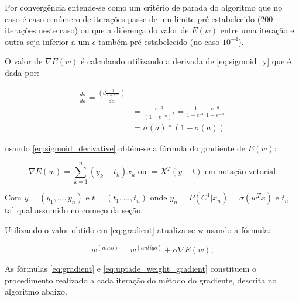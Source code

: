 Por convergência entende-se como um critério de parada do algoritmo que no caso é caso o número de
iterações passe de um limite pré-estabelecido (200 iterações neste caso) ou que a diferença do valor
de $E(w)$ entre uma iteração e outra seja inferior a um $\epsilon$ também pré-estabelecido (no caso
$10^{-4}$).

O valor de $\nabla E(w)$ é calculando utilizando a derivada de \ref{eq:sigmoid_y} que é dada
por:

\begin{center}
	\begin{equation}
		\begin{split}
		\label{eq:sigmoid_derivative}
			\frac{d \sigma}{d a} = \frac{\left(d \frac{1}{1 + e^{-a}}\right)}{d a} \\
				& = \frac{e^{-a}}{(1 - e^{-a})^2} = \frac{1}{1 - e^{-a}}\frac{e^{-a}}{1 - e^{-a}} \\
				& = \sigma(a)*(1 - \sigma(a))
		\end{split}
	\end{equation}
\end{center}

usando \ref{eq:sigmoid_derivative} obtém-se a fórmula do gradiente de $E(w)$:

\begin{center}
	\begin{equation}\label{eq:gradient}
		\nabla E(w) = \sum_{k = 1}^{n}(y_k - t_k)x_k \text{ ou } = X^T(y - t) \text{ em notação vetorial}
	\end{equation}
\end{center}

Com $y = (y_1, \ldots, y_n)$ e $t = (t_1, \ldots, t_n)$ onde
$y_n = P(C^1 | x_n) = \sigma(w^Tx)$ e $t_n$ tal qual assumido no começo da seção.

Utilizando o valor obtido em \ref{eq:gradient} atualiza-se w usando a fórmula:

\begin{center}
	\begin{equation}
		\label{eq:uptade_weight_gradient}
		w^{ ( novo )} = w^{ (antigo) }  + \alpha \nabla E(w)\text{,}
	\end{equation}
\end{center}

As fórmulas \ref{eq:gradient} e \ref{eq:uptade_weight_gradient} constituem o procedimento
realizado a cada iteração do método do gradiente, descrita no algoritmo abaixo.

